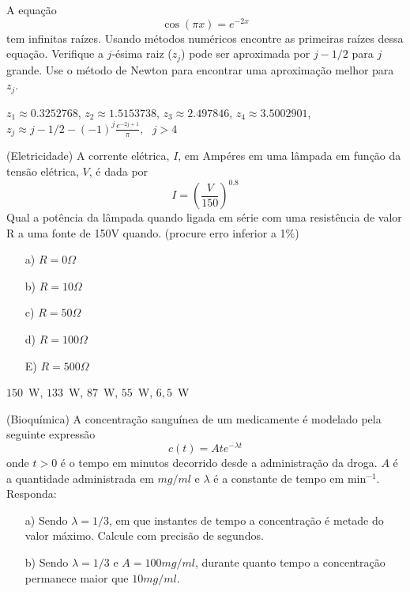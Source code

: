 \begin{exer} A equação \begin{equation} \cos(\pi x)=e^{-2x} \end{equation} tem infinitas raízes.
Usando  métodos numéricos encontre as primeiras raízes dessa equação. Verifique a $j$-ésima raiz ($z_j$) pode ser aproximada por $j-1/2$ para $j$ grande. Use o método de Newton para encontrar uma aproximação melhor para $z_j$.
\end{exer}
\begin{resp}

 $z_1\approx 0.3252768 $, $z_2\approx 1.5153738$, $z_3\approx 2.497846  $, $z_4\approx 3.5002901$, $z_j\approx j-1/2-(-1)^j\frac{e^{-2j+1}}{\pi}, ~~~j>4$

\end{resp}


\begin{exer}(Eletricidade) A corrente elétrica, $I$, em Ampéres em uma lâmpada em função da tensão elétrica, $V$, é dada por
\begin{equation} I=\left(\frac{V}{150}\right)^{0.8} \end{equation}
Qual a potência da lâmpada quando ligada em série com uma resistência de valor R a uma fonte de 150V quando. (procure erro inferior a 1\%)
\begin{itemize}
\item [a)] $R=0\Omega$
\item [b)] $R=10\Omega$
\item [c)] $R=50\Omega$
\item [d)] $R=100\Omega$
\item [E)] $R=500\Omega$
\end{itemize}
\end{exer}
\begin{resp}

$150$~W, $133$~W, $87$~W, $55$~W, $6,5$~W

\end{resp}




\begin{exer} (Bioquímica) A concentração sanguínea de um medicamente é modelado pela seguinte expressão
\begin{equation} c(t)=Ate^{-\lambda t} \end{equation}
onde $t>0$ é o tempo em minutos decorrido desde a administração da droga. $A$ é a quantidade administrada em $mg/ml$ e $\lambda$ é a constante de tempo em min$^{-1}$.
Responda:
\begin{itemize}
\item[a)] Sendo $\lambda=1/3$, em que instantes de tempo a concentração é metade do valor máximo. Calcule com precisão de segundos.
\item[b)] Sendo $\lambda=1/3$ e $A=100mg/ml$, durante quanto tempo a concentração permanece maior que $10mg/ml$.
\end{itemize}
\end{exer}

